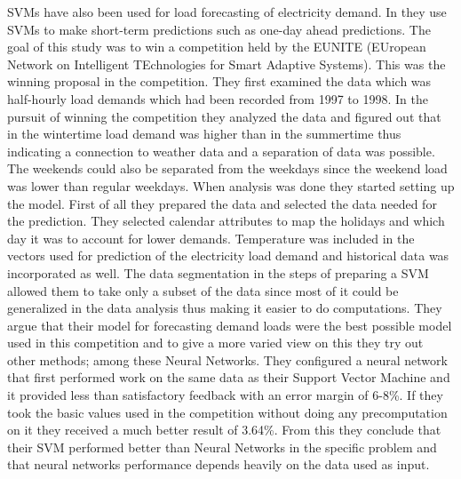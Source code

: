 SVMs have also been used for load forecasting of electricity demand. In \cite{chen2004load} they use SVMs to make short-term predictions such as one-day ahead predictions. The goal of this study was to win a competition held by the EUNITE (EUropean Network on Intelligent TEchnologies for Smart Adaptive Systems). This was the winning proposal in the competition. They first examined the data which was half-hourly load demands which had been recorded from 1997 to 1998. In the pursuit of winning the competition they analyzed the data and figured out that in the wintertime load demand was higher than in the summertime thus indicating a connection to weather data and a separation of data was possible. The weekends could also be separated from the weekdays since the weekend load was lower than regular weekdays. When analysis was done they started setting up the model. First of all they prepared the data and selected the data needed for the prediction. They selected calendar attributes to map the holidays and which day it was to account for lower demands. Temperature was included in the vectors used for prediction of the electricity load demand and historical data was incorporated as well. The data segmentation in the steps of preparing a SVM allowed them to take only a subset of the data since most of it could be generalized in the data analysis thus making it easier to do computations. They argue that their model for forecasting demand loads were the best possible model used in this competition and to give a more varied view on this they try out other methods; among these Neural Networks. They configured a neural network that first performed work on the same data as their Support Vector Machine and it provided less than satisfactory feedback with an error margin of 6-8\%. If they took the basic values used in the competition without doing any precomputation on it they received a much better result of 3.64\%. From this they conclude that their SVM performed better than Neural Networks in the specific problem and that neural networks performance depends heavily on the data used as input. 